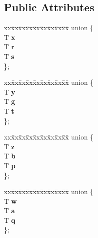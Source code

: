 \subsection*{Public Attributes}
\begin{DoxyCompactItemize}
\item 
\begin{tabbing}
xx\=xx\=xx\=xx\=xx\=xx\=xx\=xx\=xx\=\kill
union \{\\
\>T {\bfseries x}\\
\>T {\bfseries r}\\
\>T {\bfseries s}\\
\}; \hypertarget{structglm_1_1detail_1_1tvec4_a59e3b4d37390862e949bfe4ce93231db}{}\label{structglm_1_1detail_1_1tvec4_a59e3b4d37390862e949bfe4ce93231db}
\\

\end{tabbing}\item 
\begin{tabbing}
xx\=xx\=xx\=xx\=xx\=xx\=xx\=xx\=xx\=\kill
union \{\\
\>T {\bfseries y}\\
\>T {\bfseries g}\\
\>T {\bfseries t}\\
\}; \hypertarget{structglm_1_1detail_1_1tvec4_a054a07e314c67133c83cffea1338f089}{}\label{structglm_1_1detail_1_1tvec4_a054a07e314c67133c83cffea1338f089}
\\

\end{tabbing}\item 
\begin{tabbing}
xx\=xx\=xx\=xx\=xx\=xx\=xx\=xx\=xx\=\kill
union \{\\
\>T {\bfseries z}\\
\>T {\bfseries b}\\
\>T {\bfseries p}\\
\}; \hypertarget{structglm_1_1detail_1_1tvec4_af281025d8b12173bd13c7ae934c82dd6}{}\label{structglm_1_1detail_1_1tvec4_af281025d8b12173bd13c7ae934c82dd6}
\\

\end{tabbing}\item 
\begin{tabbing}
xx\=xx\=xx\=xx\=xx\=xx\=xx\=xx\=xx\=\kill
union \{\\
\>T {\bfseries w}\\
\>T {\bfseries a}\\
\>T {\bfseries q}\\
\}; \hypertarget{structglm_1_1detail_1_1tvec4_a52723f13a054c0858ef68f336765a3a4}{}\label{structglm_1_1detail_1_1tvec4_a52723f13a054c0858ef68f336765a3a4}
\\

\end{tabbing}\end{DoxyCompactItemize}



